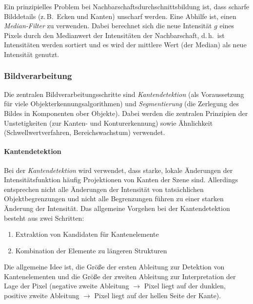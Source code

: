 \documentclass[a4paper, 11pt, accentcolor = tud3b]{tudreport}
\renewcommand{\dh}{d.\,h.~}
\newcommand{\zB}{z.\,B.~}
\begin{document}
						Ein prinzipielles Problem bei Nachbarschaftsdurchschnittsbildung ist, dass scharfe Bilddetails (\zB Ecken und Kanten) unscharf werden. Eine Abhilfe ist, einen \emph{Median-Filter} zu verwenden. Dabei berechnet sich die neue Intensität \(g\) eines Pixels durch den Medianwert der Intensitäten der Nachbarschaft, \dh ist Intensitäten werden sortiert und es wird der mittlere Wert (der Median) als neue Intensität genutzt.

				\subsubsection{Bildverarbeitung}
					Die zentralen Bildverarbeitungsschritte sind \emph{Kantendetektion} (als Voraussetzung für viele Objekterkennungsalgorithmen) und \emph{Segmentierung} (die Zerlegung des Bildes in Komponenten ober Objekte). Dabei werden die zentralen Prinzipien der Unstetigkeiten (zur Kanten- und Konturerkennung) sowie Ähnlichkeit (Schwellwertverfahren, Bereichswachstum) verwendet.

					\paragraph{Kantendetektion}
						Bei der \emph{Kantendetektion} wird verwendet, dass starke, lokale Änderungen der Intensitätsfunktion häufig Projektionen von Kanten der Szene sind. Allerdings entsprechen nicht alle Änderungen der Intensität von tatsächlichen Objektbegrenzungen und nicht alle Begrenzungen führen zu einer starken Änderung der Intensität. Das allgemeine Vorgehen bei der Kantendetektion besteht aus zwei Schritten:
						\begin{enumerate}
							\item Extraktion von Kandidaten für Kantenelemente
							\item Kombination der Elemente zu längeren Strukturen
						\end{enumerate}
					
						Die allgemeine Idee ist, die Größe der ersten Ableitung zur Detektion von Kantenelementen und die Größe der zweiten Ableitung zur Interpretation der Lage der Pixel (negative zweite Ableitung \(\to\) Pixel liegt auf der dunklen, positive zweite Ableitung \(\to\) Pixel liegt auf der hellen Seite der Kante).
						
\end{document}
